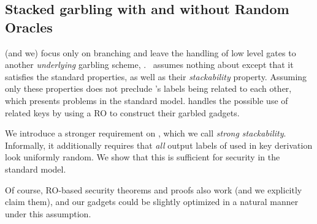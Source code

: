 \subsection{Stacked garbling with and without Random Oracles}
\label{sec:techOverviewRO}



\HK (and we)
focus only on branching and leave the handling of low level gates to
another \emph{underlying} garbling scheme, \underscheme.
\HK\ assumes nothing about \underscheme except that it satisfies the standard
\cite{CCS:BelHoaRog12} properties, as well as their {\em stackability} property.
Assuming only  these properties does not preclude \underscheme's
labels being related to each other, which presents problems in the
standard model. \HK handles the possible use of related keys by using
a RO to construct their garbled gadgets.

We introduce a stronger requirement on \underscheme, which we call {\em strong stackability}.  Informally, it additionally requires that {\em all} output labels of \underscheme used in key derivation look uniformly random.  We show that this is sufficient for security in the standard model.

Of course, RO-based security theorems and proofs also work (and we explicitly claim them), and our gadgets could be slightly optimized in a natural manner under this assumption.






